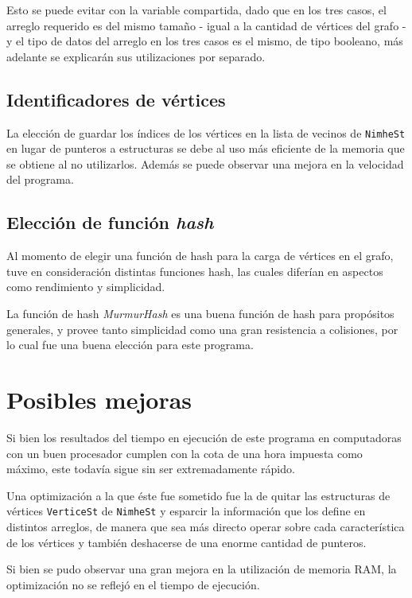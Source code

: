 \documentclass[11pt,a4paper]{article}
\theoremstyle{plain}
\begin{document}
Esto se puede evitar con la variable compartida, dado que en los tres casos, el arreglo requerido es del mismo tamaño - igual a la cantidad de vértices del grafo - y el tipo de datos del arreglo en los tres casos es el mismo, de tipo booleano, más adelante se explicarán sus utilizaciones por separado.

	\subsection{Identificadores de vértices}
	\label{sec:7.7}
	
La elección de guardar los índices de los vértices en la lista de vecinos de \texttt{NimheSt} en lugar de punteros a estructuras se debe al uso más eficiente de la memoria que se obtiene al no utilizarlos. Además se puede observar una mejora en la velocidad del programa. 

	\subsection{Elección de función \emph{hash}}
	\label{sec:7.8}

Al momento de elegir una función de hash para la carga de vértices en el grafo, tuve en consideración distintas funciones hash, las cuales diferían en aspectos como rendimiento y simplicidad.

La función de hash \emph{MurmurHash} es una buena función de hash para propósitos generales, y provee tanto simplicidad como una gran resistencia a colisiones, por lo cual fue una buena elección para este programa.\cite {5}

\section{Posibles mejoras}

Si bien los resultados del tiempo en ejecución de este programa en computadoras con un buen procesador cumplen con la cota de una hora impuesta como máximo, este todavía sigue sin ser extremadamente rápido.

Una optimización a la que éste fue sometido fue la de quitar las estructuras de vértices \texttt{VerticeSt} de \texttt{NimheSt} y esparcir la información que los define en distintos arreglos, de manera que sea más directo operar sobre cada característica de los vértices y también deshacerse de una enorme cantidad de punteros.

Si bien se pudo observar una gran mejora en la utilización de memoria RAM, la optimización no se reflejó en el tiempo de ejecución.
\end{document}
